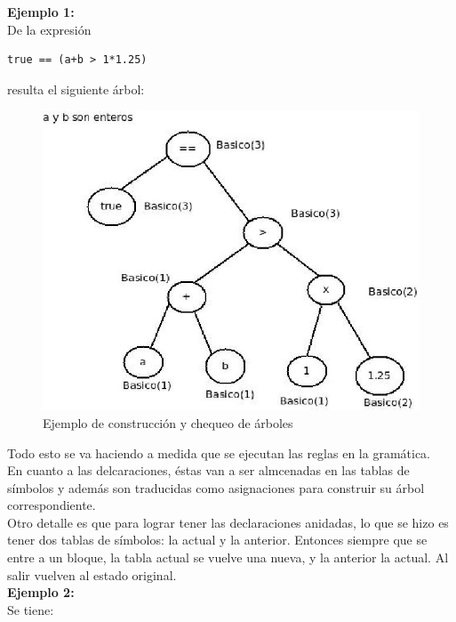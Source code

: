 \documentclass[11pt, spanish]{report}
\begin{document}
\textbf{Ejemplo 1:}\\

De la expresi\'on 

\begin{verbatim}
true == (a+b > 1*1.25) 
\end{verbatim}

resulta el siguiente \'arbol:

\begin{figure}[htp]
  \centering
  \mbox{\includegraphics[scale=0.5]{arbol.jpg}}
  \caption{Ejemplo de construcci\'on y chequeo de \'arboles}
  \label{fig arbol}
\end{figure}

Todo esto se va haciendo a medida que se ejecutan las reglas en la gram\'atica.\\

En cuanto a las delcaraciones, \'estas van a ser almcenadas en las tablas de s\'imbolos y adem\'as son traducidas como asignaciones para construir su \'arbol correspondiente.\\

Otro detalle es que para lograr tener las declaraciones anidadas, lo que se hizo es tener dos tablas de s\'imbolos: la actual y la anterior. Entonces siempre 
que se entre a un bloque, la tabla actual se vuelve una nueva, y la anterior la actual. Al salir vuelven al estado original.\\

\textbf{Ejemplo 2:}\\

Se tiene:
\end{document}
